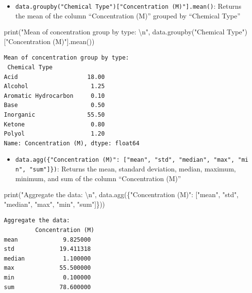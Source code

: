 \documentclass[
  letterpaper,
  DIV=11,
  numbers=noendperiod]{scrreprt}
\newenvironment{Shaded}{\begin{snugshade}}{\end{snugshade}}
\newcommand{\BuiltInTok}[1]{\textcolor[rgb]{0.00,0.23,0.31}{#1}}
\newcommand{\CharTok}[1]{\textcolor[rgb]{0.13,0.47,0.30}{#1}}
\newcommand{\NormalTok}[1]{\textcolor[rgb]{0.00,0.23,0.31}{#1}}
\newcommand{\StringTok}[1]{\textcolor[rgb]{0.13,0.47,0.30}{#1}}
\providecommand{\tightlist}{%
  \setlength{\itemsep}{0pt}\setlength{\parskip}{0pt}}\usepackage{longtable,booktabs,array}
\begin{document}
\begin{itemize}
\tightlist
\item
  \texttt{data.groupby("Chemical\ Type"){[}"Concentration\ (M)"{]}.mean()}:
  Returns the mean of the column ``Concentration (M)'' grouped by
  ``Chemical Type''
\end{itemize}

\begin{Shaded}
\begin{Highlighting}[]
\BuiltInTok{print}\NormalTok{(}\StringTok{"Mean of concentration group by type: }\CharTok{\textbackslash{}n}\StringTok{"}\NormalTok{, data.groupby(}\StringTok{"Chemical Type"}\NormalTok{)[}\StringTok{"Concentration (M)"}\NormalTok{].mean())}
\end{Highlighting}
\end{Shaded}

\begin{verbatim}
Mean of concentration group by type: 
 Chemical Type
Acid                    18.00
Alcohol                  1.25
Aromatic Hydrocarbon     0.10
Base                     0.50
Inorganic               55.50
Ketone                   0.80
Polyol                   1.20
Name: Concentration (M), dtype: float64
\end{verbatim}

\begin{itemize}
\tightlist
\item
  \texttt{data.agg(\{"Concentration\ (M)":\ {[}"mean",\ "std",\ "median",\ "max",\ "min",\ "sum"{]}\})}:
  Returns the mean, standard deviation, median, maximum, minimum, and
  sum of the column ``Concentration (M)''
\end{itemize}

\begin{Shaded}
\begin{Highlighting}[]
\BuiltInTok{print}\NormalTok{(}\StringTok{"Aggregate the data: }\CharTok{\textbackslash{}n}\StringTok{"}\NormalTok{, data.agg(\{}\StringTok{"Concentration (M)"}\NormalTok{: [}\StringTok{"mean"}\NormalTok{, }\StringTok{"std"}\NormalTok{, }\StringTok{"median"}\NormalTok{, }\StringTok{"max"}\NormalTok{, }\StringTok{"min"}\NormalTok{, }\StringTok{"sum"}\NormalTok{]\}))}
\end{Highlighting}
\end{Shaded}

\begin{verbatim}
Aggregate the data: 
         Concentration (M)
mean             9.825000
std             19.411318
median           1.100000
max             55.500000
min              0.100000
sum             78.600000
\end{verbatim}
\end{document}
